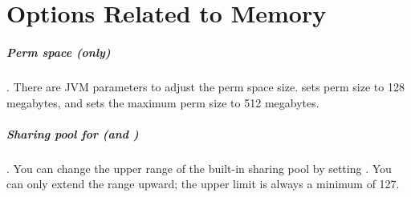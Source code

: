 \chapter{\jre Options Related to Memory}
\label{chapter:jre-options}

\paragraph{Perm space (\oracle only)}. There are JVM parameters to adjust
the perm space size.  sets perm size to 128 megabytes,
and  sets the maximum perm size to 512 megabytes.

\paragraph{Sharing pool for  (\oracle and \ibm \jres)}. You can
change the upper range of the built-in  sharing pool by setting 
. You can only extend the range upward; the upper
limit is always a minimum of 127.
